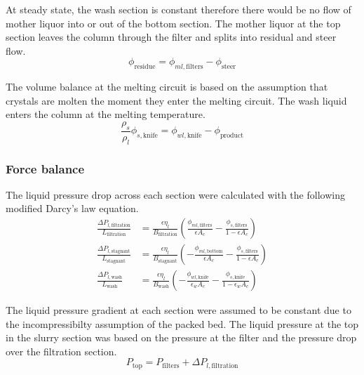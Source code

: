 At steady state, the wash section is constant therefore there  would be no flow of mother liquor into or out of the bottom section. The mother liquor at the top section leaves the column through the filter and splits into residual and steer flow. 
\begin{equation}
\phi_{\mathrm{residue}}= \phi_{ml,\mathrm{filters}} - \phi_{\mathrm{steer}}
\end{equation}

The volume balance at the melting circuit is based on the assumption that crystals are molten the moment they enter the melting circuit. The wash liquid enters the column at the melting temperature. 
\begin{equation}
\frac{\rho_s}{\rho_l}\phi_{s,\mathrm{knife}}= \phi_{wl,\mathrm{knife}} - \phi_{\mathrm{product}}
\end{equation}


\subsubsection{Force balance}
The liquid pressure drop across each section were calculated with the following modified Darcy's law equation. 
\begin{align}
    \frac{\Delta P_{l,\mathrm{filtration}}}{L_{\mathrm{filtration}}} &= \frac{\epsilon \eta_{l}}{B_{\mathrm{filtration}}}\left(\frac{\phi_{ml,\mathrm{filters}}}{\epsilon A_c} - \frac{\phi_{s,\mathrm{filters}}}{1-\epsilon A_c}\right) \\
    \frac{\Delta P_{l,\mathrm{stagnant}}}{L_{\mathrm{stagnant}}} &= \frac{\epsilon \eta_{l}}{B_{\mathrm{stagnant}}}\left(-\frac{\phi_{ml,\mathrm{bottom}}}{\epsilon A_c} - \frac{\phi_{s,\mathrm{filters}}}{1-\epsilon A_c}\right) \\
    \frac{\Delta P_{l,\mathrm{wash}}}{L_{\mathrm{wash}}} &= \frac{\epsilon \eta_{l}}{B_{\mathrm{wash}}}\left(-\frac{\phi_{wl,\mathrm{knife}}}{\epsilon_w A_c} - \frac{\phi_{s,\mathrm{knife}}}{1-\epsilon_w A_c}\right)
\end{align}

The liquid pressure gradient at each section were assumed to be constant due to the incompressibilty assumption of the packed bed. The liquid pressure at the top in the slurry section was based on the pressure at the filter and the pressure drop over the filtration section. 
\begin{equation}
P_{\mathrm{top}} = P_{\mathrm{filters}} + \Delta P_{l,\mathrm{filtration}}
\end{equation}

